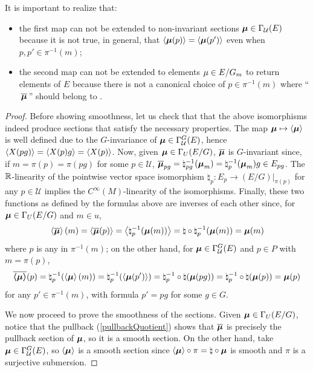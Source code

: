 It is important to realize that:
\begin{itemize}
    \item the first map can not be extended to non-invariant sections $\bm{\mu} \in \Gamma_{\mathcal U}(E)$ because it is not true, in general, that $\left\langle \bm{\mu}(p) \right\rangle = \left\langle \bm{\mu}(p') \right\rangle$ even when $p, p' \in \pi^{-1}(m)$;
    
    \item the second map can not be extended to elements $\mathfrak{\mu} \in E/G_m$ to return elements of $E$ because there is not a canonical choice of $p \in \pi^{-1}(m)$ where ``$\,\overline{\bm{\mathfrak{\mu}}}\,$'' should belong to .
\end{itemize}

\begin{proof}
Before showing smoothness, let us check that that the above isomorphisms indeed produce sections that satisfy the necessary properties.
The map $\bm{\mu} \mapsto \left\langle \bm{\mu} \right\rangle$ is well defined due to the $G$-invariance of $\bm{\mu} \in \Gamma^G_{\mathcal U}(E)$, hence $\left\langle X(pg) \right\rangle = \left\langle X(p)g \right\rangle = \left\langle X(p) \right\rangle$. 
Now, given $\bm{\mathfrak{\mu}} \in \Gamma_U(E/G)$, $\overline{\bm{\mathfrak{\mu}}}$ is $G$-invariant since, if $m = \pi(p) = \pi(pg)$ for some $p \in \mathcal U$, $\overline{\bm{\mathfrak{\mu}}}_{pg} = \natural^{-1}_{pg}(\bm{\mathfrak{\mu}}_{m}) = \natural^{-1}_{p}(\bm{\mathfrak{\mu}}_{m})g \in E_{pg}$. 
The $\mathbb{R}$-linearity of the pointwise vector space isomorphism $\natural_p:E_p \to (E/G)|_{\pi(p)}$ for any $p \in \mathcal U$ implies the $C^{\infty}(M)$-linearity of the isomorphisms.
Finally, these two functions as defined by the formulas above are inverses of each other since, 
for $\bm{\mathfrak{\mu}} \in \Gamma_U(E/G)$ and $m \in u$, 
\[\left\langle \overline{\bm{\mathfrak{\mu}}} \right\rangle(m) = \left\langle \overline{\bm{\mathfrak{\mu}}} (p) \right\rangle = \left\langle  \natural_p^{-1}(\bm{\mathfrak{\mu}}(m))  \right\rangle = \natural \circ \natural_p^{-1}(\bm{\mathfrak{\mu}}(m)) = \bm{\mathfrak{\mu}}(m)\] 
where $p$ is any in $\pi^{-1}(m)$; on the other hand,
for $\bm{\mu} \in \Gamma^G_{\mathcal U}(E)$ and $p \in P$ with $m = \pi(p)$, 
\[\overline{\bm{\left\langle \bm{\mu} \right\rangle}}(p) = \natural_p^{-1}(\left\langle \bm{\mu} \right\rangle(m)) = \natural_p^{-1}(\left\langle \bm{\mu}(p') \right\rangle) = \natural_p^{-1} \circ \natural (\bm{\mu}(pg)) = \natural_p^{-1} \circ \natural (\bm{\mu}(p)) = \bm{\mu}(p)\]
for any $p' \in \pi^{-1}(m)$, with formula $p' = pg$ for some $g\in G$.

We now proceed to prove the smoothness of the sections. Given $\bm{\mathfrak{\mu}} \in \Gamma_U(E/G)$, notice that the pullback (\ref{pullbackQuotient}) shows that $\overline{\bm{\mathfrak{\mu}}}$ is precisely the pullback section of $\bm{\mathfrak{\mu}}$, so it is a smooth section. On the other hand, take $\bm{\mu} \in \Gamma^G_{\mathcal U}(E)$, so $\left\langle \bm{\mu} \right\rangle$ is a smooth section since $\left\langle \bm{\mu} \right\rangle \circ \pi = \natural \circ \bm{\mu}$ is smooth and $\pi$ is a surjective submersion.

\end{proof}


